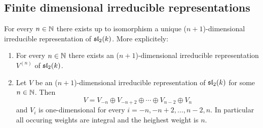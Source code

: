 \subsection{Finite dimensional irreducible representations}


\begin{thrm}
 For every $n \in \mathbb{N}$ there exists up to isomorphism a unique ($n+1$)-dimensional irreducible representation of $\mathfrak{sl}_2(k)$. More explicitely:
 \begin{enumerate}[leftmargin=*]
  \item
   For every $n \in \mathbb{N}$ there exists an ($n+1$)-dimensional irreducible representation $V^{(n)}$ of $\mathfrak{sl}_2(k)$.
  \item
   Let $V$ be an ($n+1$)-dimensional irreducible representation of $\mathfrak{sl}_2(k)$ for some $n \in \mathbb{N}$. Then
   \[
    V = V_{-n} \oplus V_{-n+2} \oplus \dotsb \oplus V_{n-2} \oplus V_n
   \]
   and $V_i$ is one-dimensional for every $i = -n, -n+2, \dotsc, n-2, n$. In particular all occuring weights are integral and the heighest weight is $n$.
   

\end{enumerate}
\end{thrm}
